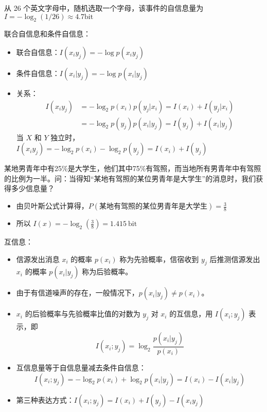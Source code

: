 \begin{remark}
    从 26 个英文字母中，随机选取一个字母，该事件的自信息量为 $I=-\log _{2}(1 / 26) \approx 4.7 \mathrm{bit}$
\end{remark}

\begin{remark}
    联合自信息和条件自信息：
    \begin{itemize}
        \item 联合自信息：$I(x_i y_j) = -\log p(x_iy_j)$
        \item 条件自信息：$I(x_i|y_j) = -\log p(x_i|y_j)$
        \item 关系：\begin{align*}
            I\left(x_{i} y_{j}\right)&=-\log _{2} p\left(x_{i}\right) p\left(y_{j} | x_{i}\right)=I\left(x_{i}\right)+I\left(y_{j} | x_{i}\right) \\
            &=-\log _{2} p\left(y_{j}\right) p\left(x_{i} | y_{j}\right)=I\left(y_{j}\right)+I\left(x_{i} | y_{j}\right)
        \end{align*}
        当 $X$ 和 $Y$ 独立时，$I\left(x_{i} y_{j}\right)=-\log _{2} p\left(x_{i}\right)-\log _{2} p\left(y_{j}\right)=I\left(x_{i}\right)+I\left(y_{j}\right)$
    \end{itemize}
\end{remark}

\begin{remark}
    某地男青年中有25\%是大学生，他们其中75\%有驾照，而当地所有男青年中有驾照的比例为一半。问：当得知“某地有驾照的某位男青年是大学生”的消息时，我们获得多少信息量？
    \begin{itemize}
        \item 由贝叶斯公式计算得，$P(\text{某地有驾照的某位男青年是大学生}) = \frac{3}{8}$
        \item 所以 $I(x) = -\log_2(\frac{3}{8}) = \SI{1.415}{\mathrm{bit}}$ 
    \end{itemize}
\end{remark}

\begin{remark}
    互信息：
    \begin{itemize}
        \item 信源发出消息 $x_i$ 的概率 $p(x_i)$ 称为先验概率，信宿收到 $y_j$ 后推测信源发出 $x_i$ 的概率 $p(x_i|y_j)$ 称为后验概率。
        \item 由于有信道噪声的存在，一般情况下，$p(x_i|y_j) \neq p(x_i)$。
        \item $x_i$ 的后验概率与先验概率比值的对数为 $y_j$ 对 $x_i$ 的互信息，用 $I(x_i;y_j)$ 表示，即 \[I\left(x_{i} ; y_{j}\right)=\log _{2} \frac{p\left(x_{i} | y_{j}\right)}{p\left(x_{i}\right)} \]
        \item 互信息量等于自信息量减去条件自信息：\[I\left(x_{i} ; y_{j}\right)=-\log _{2} p\left(x_{i}\right)+\log _{2} p\left(x_{i} | y_{j}\right)=I\left(x_{i}\right)-I\left(x_{i} | y_{j}\right)\]
        \item 第三种表达方式：$I(x_i;y_j) = I(x_i) + I(y_j) - I(x_iy_j)$
    \end{itemize}
\end{remark}

